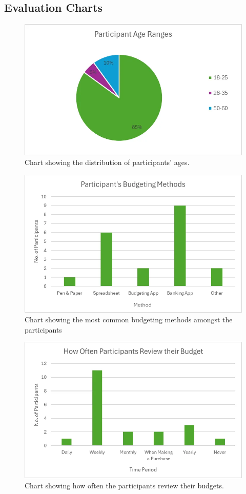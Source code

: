 \documentclass{l4proj}
\begin{document}
\begin{appendices}
\chapter{Evaluation Charts}
\label{app:evaluation-charts}
\begin{figure}[H]
    \centering
    \includegraphics[width=0.75\linewidth]{images/Evaluation-Charts/age-ranges.png}
    \caption{Chart showing the distribution of participants' ages.}
    \label{fig:enter-label}
\end{figure}

\begin{figure}[H]
    \centering
    \includegraphics[width=0.75\linewidth]{images/Evaluation-Charts/budget-methods.png}
    \caption{Chart showing the most common budgeting methods amongst the participants}
    \label{fig:enter-label}
\end{figure}

\begin{figure}[H]
    \centering
    \includegraphics[width=0.75\linewidth]{images/Evaluation-Charts/budget-time-periods.png}
    \caption{Chart showing how often the participants review their budgets.}
    \label{fig:enter-label}
\end{figure}


\end{appendices}
\end{document}
